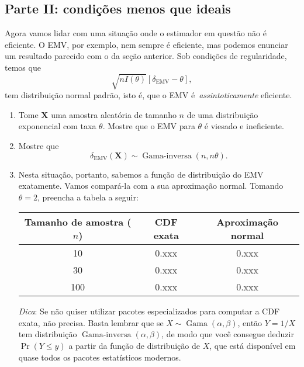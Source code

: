 \documentclass[a4paper,10pt, notitlepage]{report}
\begin{document}
\subsection*{Parte II: condições menos que ideais}

Agora vamos lidar com uma situação onde o estimador em questão não é eficiente.
O EMV, por exemplo, nem sempre é eficiente, mas podemos enunciar um resultado parecido com o da seção anterior. 
Sob condições de regularidade, temos que
 $$
 \sqrt{nI(\theta)}\left[\delta_{\text{EMV}}-\theta\right],
 $$
tem distribuição normal padrão,  isto é, que o EMV é~\textit{assintoticamente} eficiente.

\begin{enumerate}\addtocounter{enumi}{4}
 \item Tome $\boldsymbol{X}$ uma amostra aleatória de tamanho $n$ de uma distribuição exponencial com taxa $\theta$.
 Mostre que o EMV para $\theta$ é viesado e ineficiente.
 \item Mostre que
 $$
 \delta_{\text{EMV}}(\boldsymbol{X}) \sim \operatorname{Gama-inversa}(n, n\theta).
 $$
 \item Nesta situação, portanto, sabemos a função de distribuição do EMV exatamente.
 Vamos compará-la com a sua aproximação normal.
 Tomando $\theta = 2$, preencha a tabela a seguir:
 \begin{table}[!ht]
\begin{center}
 \begin{tabular}{ccc}
\hline
Tamanho de amostra ($n$) & CDF exata & Aproximação normal \\ \hline
10 & 0.xxx & 0.xxx \\
30 & 0.xxx & 0.xxx \\
100 & 0.xxx & 0.xxx
\end{tabular}
\end{center}
\end{table}

 \textit{Dica}: Se não quiser utilizar pacotes especializados para computar a CDF exata, não precisa. 
 Basta lembrar que se $X \sim \operatorname{Gama}(\alpha, \beta)$, então $Y = 1/X$ tem distribuição $\operatorname{Gama-inversa}(\alpha, \beta)$, de modo que você consegue deduzir $\operatorname{Pr}(Y \leq y)$ a partir da função de distribuição de $X$, que está disponível em quase todos os pacotes estatísticos modernos. 
\end{enumerate}



\end{document}
